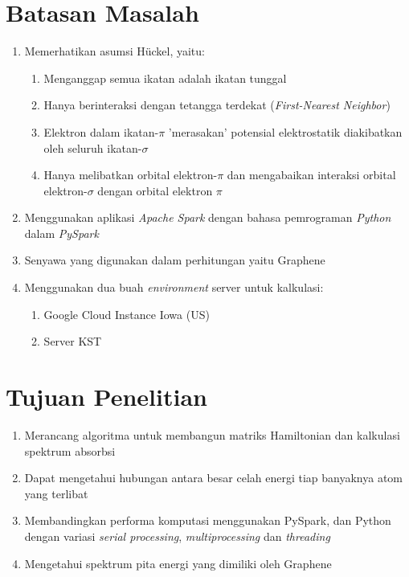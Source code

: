 \documentclass[12pt,a4paper]{report}
\begin{document}
	\section{Batasan Masalah}
	\begin{enumerate}
		\item Memerhatikan asumsi Hückel, yaitu:
		\begin{enumerate}
			\item Menganggap semua ikatan adalah ikatan tunggal
			\item Hanya berinteraksi dengan tetangga terdekat (\textit{First-Nearest Neighbor})
			\item Elektron dalam ikatan-$\pi$ 'merasakan' potensial elektrostatik diakibatkan oleh seluruh ikatan-$\sigma$
			\item Hanya melibatkan orbital elektron-$\pi$ dan mengabaikan interaksi orbital elektron-$\sigma$ dengan orbital elektron $\pi$
		\end{enumerate}
		\item Menggunakan aplikasi \textit{Apache Spark} dengan bahasa pemrograman \textit{Python} dalam \textit{PySpark}
		\item Senyawa yang digunakan dalam perhitungan yaitu Graphene
		\item Menggunakan dua buah \textit{environment} server untuk kalkulasi:
		\begin{enumerate}
			\item Google Cloud Instance Iowa (US)
			\item Server KST
		\end{enumerate}
	\end{enumerate}

	\section{Tujuan Penelitian}
	\begin{enumerate}
		\item Merancang algoritma untuk membangun matriks Hamiltonian dan kalkulasi spektrum absorbsi
		\item Dapat mengetahui hubungan antara besar celah energi tiap banyaknya atom yang terlibat
		\item Membandingkan performa komputasi menggunakan PySpark, dan Python dengan variasi \textit{serial processing}, \textit{multiprocessing} dan \textit{threading}
		\item Mengetahui spektrum pita energi yang dimiliki oleh Graphene
	\end{enumerate}
\end{document}
